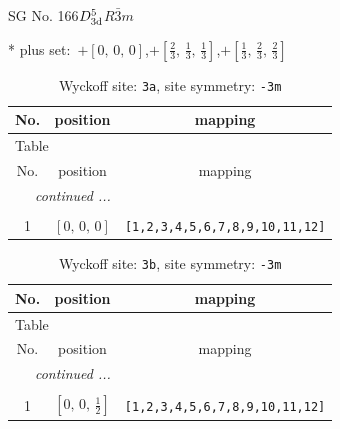 \documentclass[fleqn,8pt]{jsarticle}
\begin{document}
\setcounter{MaxMatrixCols}{32}

\renewcommand{\tablename}{Table~}
\renewcommand{\figurename}{Figure~}
\begin{center}
\LARGE
SG No. 166\quad$D_{\rm 3d}^{5}$\quad$R\bar{3}m$\quad[ trigonal ]
\end{center}
* plus set:\,\,\,$+\left[ 0,\, 0,\, 0 \right]$,\quad $+\left[ \frac{2}{3},\, \frac{1}{3},\, \frac{1}{3} \right]$,\quad $+\left[ \frac{1}{3},\, \frac{2}{3},\, \frac{2}{3} \right]$
\renewcommand{\arraystretch}{1.2}
\begin{longtable}{ccc}
\caption{Wyckoff site: {\tt 3a}, site symmetry: {\tt -3m}}
 \\
 \hline \hline
No. & position & mapping \\ \hline \endfirsthead

\multicolumn{2}{l}{\tablename\ \thetable{}} \\
 \hline \hline
No. & position & mapping \\ \hline \endhead

 \hline \hline
\multicolumn{2}{r}{\footnotesize\it continued ...} \\ \endfoot

 \hline \hline
\multicolumn{2}{r}{} \\ \endlastfoot

1 & $\left[ 0,\, 0,\, 0 \right]$ & {\tt [1,2,3,4,5,6,7,8,9,10,11,12]} \\
\end{longtable}
\renewcommand{\arraystretch}{1.2}
\begin{longtable}{ccc}
\caption{Wyckoff site: {\tt 3b}, site symmetry: {\tt -3m}}
 \\
 \hline \hline
No. & position & mapping \\ \hline \endfirsthead

\multicolumn{2}{l}{\tablename\ \thetable{}} \\
 \hline \hline
No. & position & mapping \\ \hline \endhead

 \hline \hline
\multicolumn{2}{r}{\footnotesize\it continued ...} \\ \endfoot

 \hline \hline
\multicolumn{2}{r}{} \\ \endlastfoot

1 & $\left[ 0,\, 0,\, \frac{1}{2} \right]$ & {\tt [1,2,3,4,5,6,7,8,9,10,11,12]} \\
\end{longtable}
\renewcommand{\arraystretch}{1.2}
\end{document}
